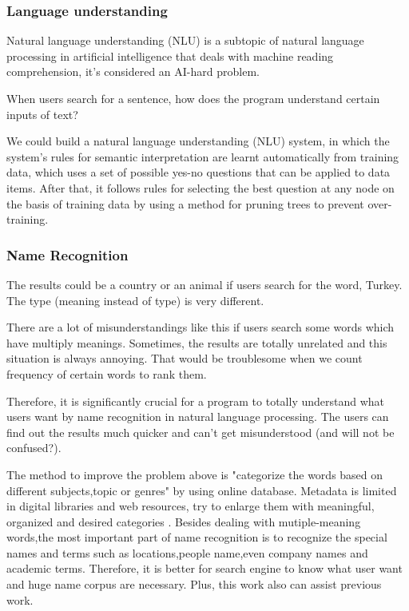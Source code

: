 \subsubsection*{Language understanding}
Natural language understanding (NLU) is a subtopic of natural language processing in artificial intelligence that deals with machine reading comprehension, it's considered an AI-hard problem.

When users search for a sentence, how does the program understand certain inputs of text? 

We could build a natural language understanding (NLU) system, in which the system's rules for semantic interpretation are learnt automatically from training data, which uses a set of possible yes-no questions that can be applied to data items. After that, it follows rules for selecting the best question at any node on the basis of training data by using a method for pruning trees to prevent over-training.

\subsubsection*{Name Recognition}

The results could be a country or an animal if users search for the word, Turkey. The type (meaning instead of type) is very different.

There are a lot of misunderstandings like this if users search some words which have multiply meanings.
 Sometimes, the results are totally unrelated and this situation is always annoying. 
 That would be troublesome when we count frequency of certain words to rank them.
 
Therefore, it is significantly crucial for a program to totally understand what users want by name recognition in natural language processing. 
The users can find out the results much quicker and can't get misunderstood (and will not be confused?).

The method to improve the problem above is "categorize the words based on different subjects,topic or genres" by using online database.
 Metadata is limited in digital libraries and web resources, try to enlarge them with meaningful, organized and desired categories \cite{Kules2006}.
Besides dealing with mutiple-meaning words,the most important part of name recognition is to recognize the special names and terms such as locations,people name,even company names and academic terms.
 Therefore, it is better for search engine to know what user want and huge name corpus are necessary. Plus, this work also can assist previous work.



